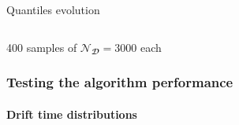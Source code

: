 \documentclass{beamer}
\begin{document}
\begin{frame}
\begin{columns}
\begin{column}{0.5\textwidth}
\begin{alertblock}{Quantiles evolution}
\begin{figure}
					\end{figure}
				\end{alertblock}
			\end{column}
		\end{columns}

		\vfill
		400 samples of $\mathcal{N}_{\mathbfcal{D}}=3000$ each 

	\end{frame}


	\begin{frame}
		\frametitle{Testing the algorithm performance}
		\framesubtitle{Drift time distributions}

		\vspace{-1.5em}

\end{frame}
\end{document}

